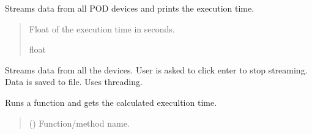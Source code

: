 \documentclass[letterpaper,10pt,english]{sphinxmanual}
\begin{document}
\begin{fulllineitems}
\begin{fulllineitems}
\end{fulllineitems}


\begin{fulllineitems}
\label{\detokenize{Setup.SetupAllDevices:Setup.SetupAllDevices.Setup_PodDevices.SetupAll._Stream}}
\pysigstartsignatures
{}
\pysigstopsignatures
\sphinxAtStartPar
Streams data from all POD devices and prints the execution time.
\begin{quote}\begin{description}
\sphinxAtStartPar
Float of the execution time in seconds.

\sphinxAtStartPar
float

\end{description}\end{quote}

\end{fulllineitems}


\begin{fulllineitems}
\label{\detokenize{Setup.SetupAllDevices:Setup.SetupAllDevices.Setup_PodDevices.SetupAll._StreamAllDevices}}
\pysigstartsignatures
{}
\pysigstopsignatures
\sphinxAtStartPar
Streams data from all the devices. User is asked to click enter to stop streaming.         Data is saved to file. Uses threading.

\end{fulllineitems}


\begin{fulllineitems}
\label{\detokenize{Setup.SetupAllDevices:Setup.SetupAllDevices.Setup_PodDevices.SetupAll._TimeFunc}}
\pysigstartsignatures
{}
\pysigstopsignatures
\sphinxAtStartPar
Runs a function and gets the calculated execultion time.
\begin{quote}\begin{description}
\sphinxAtStartPar
{} () \textendash{} Function/method name.


\end{description}
\end{quote}
\end{fulllineitems}
\end{fulllineitems}
\end{document}
